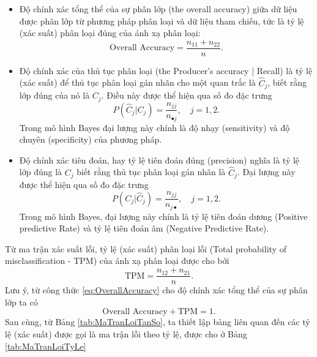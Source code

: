 \begin{itemize}
	\item Độ chính xác tổng thể của sự phân lớp (the overall accuracy) giữa dữ liệu được phân lớp từ phương pháp phân loại và dữ liệu tham chiếu, tức là tỷ lệ (xác suất) phân loại đúng của ánh xạ phân loại: 
	\begin{equation}
		\text{Overall Accuracy}=\frac{n_{11}+n_{22}}{n}.
		\label{eq:OverallAccuracy}
	\end{equation}
	\item Độ chính xác của thủ tục phân loại (the Producer's accuracy | Recall) là tỷ lệ (xác suất) để thủ tục phân loại gán nhãn cho một quan trắc là $\hat{C}_j$, biết rằng lớp đúng của nó là $C_j$. Điều này được thể hiện qua số đo đặc trưng 
	\begin{equation}
		P(\hat{C}_j | C_j) = \frac{n_{jj}}{n_{\bullet j}},\quad j=1,2.
		\label{eq:ProducerAccuracy}
	\end{equation}
	Trong mô hình Bayes đại lượng này chính là độ nhạy (sensitivity) và độ chuyên (specificity) của phương pháp.
	\item Độ chính xác tiên đoán, hay tỷ lệ tiên đoán đúng (precision) nghĩa là tỷ lệ lớp đúng là $C_j$ biết rằng thủ tục phân loại gán nhãn là $\hat{C}_j$. Đại lượng này được thể hiện qua số đo đặc trưng
	\begin{equation}
		P(C_j | \hat{C}_j)=\frac{n_{jj}}{n_{j\bullet}},\quad j=1,2.
		\label{eq:Precision}
	\end{equation}
	Trong mô hình Bayes, đại lượng này chính là tỷ lệ tiên đoán dương (Positive predictive Rate) và tỷ lệ tiên đoán âm (Negative Predictive Rate).
\end{itemize}

Từ ma trận xác suất lỗi, tỷ lệ  (xác suất) phân loại lỗi (Total probability of misclassification - TPM) của ánh xạ phân loại được cho bởi 
\begin{equation*}
	\text{TPM} = \frac{n_{12}+n_{21}}{n}.
\end{equation*} Lưu ý, từ công thức \ref{eq:OverallAccuracy} cho độ chính xác tổng thể của sự phân lớp ta có 
\begin{equation*}
	\text{Overall Accuracy} + \text{TPM} = 1.
\end{equation*} Sau cùng, từ Bảng \ref{tab:MaTranLoiTanSo}, ta thiết lập bảng liên quan đến các tỷ lệ (xác suất) được gọi là ma trận lỗi theo tỷ lệ, được cho ở Bảng \ref{tab:MaTranLoiTyLe}


